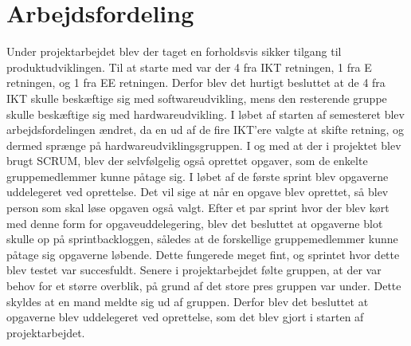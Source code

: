 \section{Arbejdsfordeling}
Under projektarbejdet blev der taget en forholdsvis sikker tilgang til produktudviklingen. Til at starte med var der 4 fra IKT retningen, 1 fra E retningen, og 1 fra EE retningen. Derfor blev det hurtigt besluttet at de 4 fra IKT skulle beskæftige sig med softwareudvikling, mens den resterende gruppe skulle beskæftige sig med hardwareudvikling. I løbet af starten af semesteret blev arbejdsfordelingen ændret, da en ud af de fire IKT’ere valgte at skifte retning, og dermed sprænge på hardwareudviklingsgruppen. 
I og med at der i projektet blev brugt SCRUM, blev der selvfølgelig også oprettet opgaver, som de enkelte gruppemedlemmer kunne påtage sig. I løbet af de første sprint blev opgaverne uddelegeret ved oprettelse. Det vil sige at når en opgave blev oprettet, så blev person som skal løse opgaven også valgt. Efter et par sprint hvor der blev kørt med denne form for opgaveuddelegering, blev det besluttet at opgaverne blot skulle op på sprintbackloggen, således at de forskellige gruppemedlemmer kunne påtage sig opgaverne løbende. Dette fungerede meget fint, og sprintet hvor dette blev testet var succesfuldt. Senere i projektarbejdet følte gruppen, at der var behov for et større overblik, på grund af det store pres gruppen var under. Dette skyldes at en mand meldte sig ud af gruppen. Derfor blev det besluttet at opgaverne blev uddelegeret ved oprettelse, som det blev gjort i starten af projektarbejdet.

